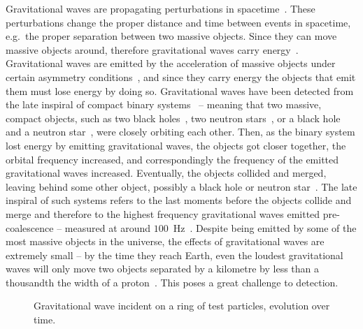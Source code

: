 Gravitational waves are propagating perturbations in spacetime~\cite{}. These perturbations change the proper distance and time between events in spacetime, e.g.\ the proper separation between two massive objects. Since they can move massive objects around, therefore gravitational waves carry energy~\cite{}. %
Gravitational waves are emitted by the acceleration of massive objects under certain asymmetry conditions~\cite{}, and since they carry energy the objects that emit them must lose energy by doing so. 
Gravitational waves have been detected from the late inspiral of compact binary systems~\cite{} -- meaning that two massive, compact objects, such as two black holes~\cite{}, two neutron stars~\cite{}, or a black hole and a neutron star~\cite{}, were closely orbiting each other. Then, as the binary system lost energy by emitting gravitational waves, the objects got closer together, the orbital frequency increased, and correspondingly the frequency of the emitted gravitational waves increased. Eventually, the objects collided and merged, leaving behind some other object, possibly a black hole or neutron star~\cite{}. The late inspiral of such systems refers to the last moments before the objects collide and merge and therefore to the highest frequency gravitational waves emitted pre-coalescence -- measured at around $100$~Hz~\cite{}. %
Despite being emitted by some of the most massive objects in the universe, the effects of gravitational waves are extremely small -- by the time they reach Earth, even the loudest gravitational waves will only move two objects separated by a kilometre by less than a thousandth the width of a proton~\cite{}. %
This poses a great challenge to detection.

\begin{figure}
	\centering
	\caption{Gravitational wave incident on a ring of test particles, evolution over time.}
	\label{fig:GW_ring_of_test_particles}
\end{figure}

